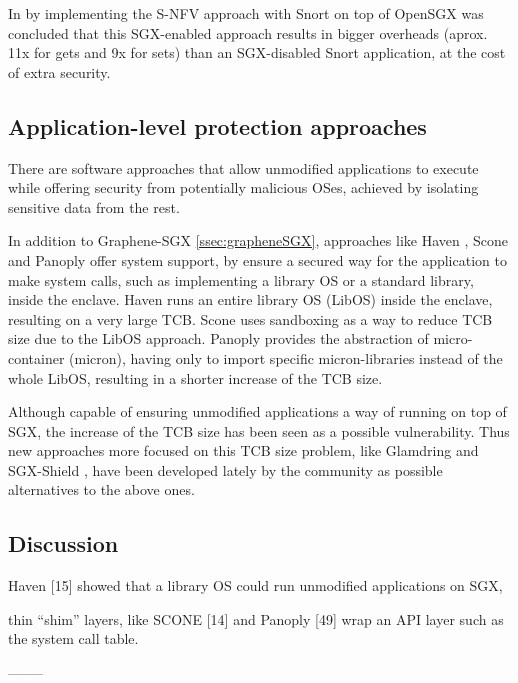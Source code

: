 In \cite{sNFVPaper} by implementing the S-NFV approach with Snort \cite{snortPaper} on top of OpenSGX was concluded that this SGX-enabled approach results in bigger overheads (aprox. 11x for gets and 9x for sets) than an SGX-disabled Snort application, at the cost of extra security.



\subsection{Application-level protection approaches}
\label{ssec:sgx_applvl_frameworks}

There are software approaches that allow unmodified applications to execute while offering security from potentially malicious OSes, achieved by isolating sensitive data from the rest. 

In addition to Graphene-SGX \ref{ssec:grapheneSGX}, approaches like Haven \cite{havenPaper}, Scone \cite{sconePaper} and Panoply \cite{panoplyPaper} offer system support, by ensure a secured way for the application to make system calls, such as implementing a library OS or a standard library, inside the enclave. 
Haven runs an entire library OS (LibOS) inside the enclave, resulting on a very large TCB. 
Scone uses sandboxing as a way to reduce TCB size due to the LibOS approach.
Panoply provides the abstraction of micro-container (micron), having only to import specific micron-libraries instead of the whole LibOS, resulting in a shorter increase of the TCB size. 

Although capable of ensuring unmodified applications a way of running on top of SGX, the increase of the TCB size has been seen as a possible vulnerability. 
Thus new approaches more focused on this TCB size problem, like Glamdring \cite{glamdringPaper} and SGX-Shield \cite{sgxShieldPaper}, have been developed lately by the community as possible alternatives to the above ones.




\subsection{Discussion}
\label{ssec:sgx_frameworks_discussion}

Haven [15] showed
that a library OS could run unmodified applications on
SGX,

thin “shim” layers, like SCONE [14] and Panoply [49] wrap 
an API layer such as the system call table.


--------


